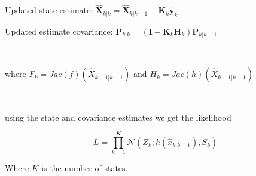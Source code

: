 Updated state estimate: $\bm{\hat X}_{k|k} = \bm{\hat X}_{k|k-1} + \textbf{K}_k \bm{\tilde y}_{k}$

Updated estimate covariance: $\textbf{P}_{k|k} = (\textbf{I} - \textbf{K}_k \textbf{H}_k)\textbf{P}_{k|k-1}$



\

where  $F_k = Jac (f)(\hat{X}_{k-1|k-1})$ and $H_k = Jac( h)(\hat{X}_{k-1|k-1})$

\

using the state and covariance estimates we get the likelihood 

$$L = \prod_{k=1}^K \mathcal{N}(Z_k; h(\hat{x}_{k|k-1}), S_k) \label{eq: EKF likelihood}$$

Where $K$ is the number of states.
\parencite{kulikov_extended_2024}

